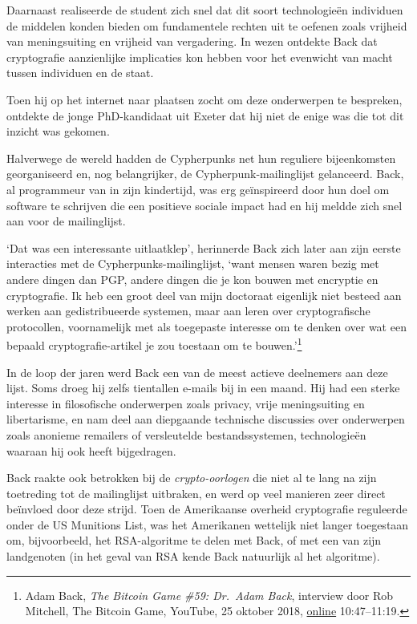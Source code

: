 \documentclass[
  a5paper,
  smalldemyvopaper,11pt,twoside,onecolumn,openright,extrafontsizes,
hidelinks]{memoir}
\begin{document}
Daarnaast realiseerde de student zich snel dat dit soort technologieën
individuen de middelen konden bieden om fundamentele rechten uit te
oefenen zoals vrijheid van meningsuiting en vrijheid van vergadering. In
wezen ontdekte Back dat cryptografie aanzienlijke implicaties kon hebben
voor het evenwicht van macht tussen individuen en de staat.

Toen hij op het internet naar plaatsen zocht om deze onderwerpen te
bespreken, ontdekte de jonge PhD-kandidaat uit Exeter dat hij niet de
enige was die tot dit inzicht was gekomen.

Halverwege de wereld hadden de Cypherpunks net hun reguliere
bijeenkomsten georganiseerd en, nog belangrijker, de
Cypherpunk-mailinglijst gelanceerd. Back, al programmeur van in zijn
kindertijd, was erg geïnspireerd door hun doel om software te schrijven
die een positieve sociale impact had en hij meldde zich snel aan voor de
mailinglijst.

`Dat was een interessante uitlaatklep', herinnerde Back zich later aan
zijn eerste interacties met de Cypherpunks-mailinglijst, `want mensen
waren bezig met andere dingen dan PGP, andere dingen die je kon bouwen
met encryptie en cryptografie. Ik heb een groot deel van mijn doctoraat
eigenlijk niet besteed aan werken aan gedistribueerde systemen, maar aan
leren over cryptografische protocollen, voornamelijk met als toegepaste
interesse om te denken over wat een bepaald cryptografie-artikel je zou
toestaan om te bouwen.'\footnote{Adam Back, \emph{The Bitcoin Game \#59:
  Dr.~Adam Back}, interview door Rob Mitchell, The Bitcoin Game,
  YouTube, 25 oktober 2018,
  \href{https://www.youtube.com/watch?v=xxYsRjanphA&t=647s}{online}
  10:47--11:19.}

In de loop der jaren werd Back een van de meest actieve deelnemers aan
deze lijst. Soms droeg hij zelfs tientallen e-mails bij in een maand.
Hij had een sterke interesse in filosofische onderwerpen zoals privacy,
vrije meningsuiting en libertarisme, en nam deel aan diepgaande
technische discussies over onderwerpen zoals anonieme remailers of
versleutelde bestandssystemen, technologieën waaraan hij ook heeft
bijgedragen.

Back raakte ook betrokken bij de \emph{crypto-oorlogen} die niet al te
lang na zijn toetreding tot de mailinglijst uitbraken, en werd op veel
manieren zeer direct beïnvloed door deze strijd. Toen de Amerikaanse
overheid cryptografie reguleerde onder de US Munitions List, was het
Amerikanen wettelijk niet langer toegestaan om, bijvoorbeeld, het
RSA-algoritme te delen met Back, of met een van zijn landgenoten (in het
geval van RSA kende Back natuurlijk al het algoritme).
\end{document}
